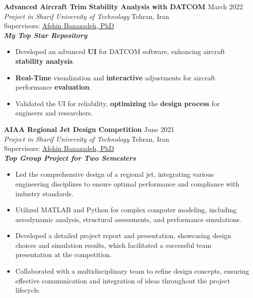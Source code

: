 \documentclass[12pt]{article}
\begin{document}
\vspace{0.2in}
\noindent
{\bfseries Advanced Aircraft Trim Stability Analysis with DATCOM
\href{https://github.com/alibaniasad1999/DATCOM-Trim-Diagram-GUI}{\faGithub}
}
\hfill March 2022 \\ 
\noindent \textit{Project in Sharif University of Technology} \hfill Tehran, Iran \\ 
\noindent Supervisors: 
\href{http://ae.sharif.edu/~portal/faculty/1014037799}{Afshin Banazadeh, PhD}\\
{\footnotesize \textbf{\textit{My Top Star Repository \faStar}}} 
\begin{itemize} \itemsep -1pt %
    \item Developed an advanced \textbf{UI} for DATCOM software, enhancing aircraft  \textbf{stability analysis}.
    \item  \textbf{Real-Time} visualization and \textbf{interactive} adjustments for aircraft performance \textbf{evaluation}.
    \item Validated the UI for reliability, \textbf{optimizing} the \textbf{design process} for engineers and researchers.
\end{itemize}


\vspace{0.2in}
\noindent
{\bfseries AIAA Regional Jet Design Competition
\href{https://github.com/alibaniasad1999/Airplane-Design-II}{\faGithub}
}
\hfill June 2021 \\ 
\noindent \textit{Project in Sharif University of Technology
} \hfill Tehran, Iran \\ 
\noindent Supervisors: 
\href{http://ae.sharif.edu/~portal/faculty/1014037799}{Afshin Banazadeh, PhD} \\
{\footnotesize \textbf{\textit{Top Group Project for Two Semesters \faMedal}}} 
\begin{itemize} \itemsep -1pt %
    \item Led the comprehensive design of a regional jet, integrating various engineering disciplines to ensure optimal performance and compliance with industry standards.
    \item Utilized MATLAB and Python for complex computer modeling, including aerodynamic analysis, structural assessments, and performance simulations.
    \item Developed a detailed project report and presentation, showcasing design choices and simulation results, which facilitated a successful team presentation at the competition.
    \item Collaborated with a multidisciplinary team to refine design concepts, ensuring effective communication and integration of ideas throughout the project lifecycle.
\end{itemize}
\end{document}
